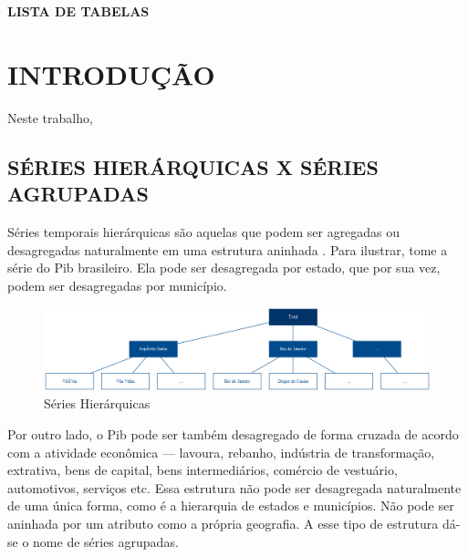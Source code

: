 \documentclass[
  12pt,
  letterpaper,
  DIV=11,
  numbers=noendperiod]{scrartcl}
\begin{document}
\newpage
\begin{center}
\MakeUppercase{\textbf{LISTA DE TABELAS}}
\end{center}
\begin{center}
\listoftables
\end{center}
\thispagestyle{empty}
\endgroup

\newpage

\hypertarget{introduuxe7uxe3o}{%
\section*{INTRODUÇÃO}\label{introduuxe7uxe3o}}

Neste trabalho,

\hypertarget{suxe9ries-hieruxe1rquicas-x-suxe9ries-agrupadas}{%
\subsection*{SÉRIES HIERÁRQUICAS X SÉRIES
AGRUPADAS}\label{suxe9ries-hieruxe1rquicas-x-suxe9ries-agrupadas}}

Séries temporais hierárquicas são aquelas que podem ser agregadas ou
desagregadas naturalmente em uma estrutura aninhada \citep{hyndman2021}.
Para ilustrar, tome a série do Pib brasileiro. Ela pode ser desagregada
por estado, que por sua vez, podem ser desagregadas por município.

\begin{figure}

{\centering \includegraphics{img/hierarq.png}

}

\caption{\label{fig-h}Séries Hierárquicas}

\end{figure}

Por outro lado, o Pib pode ser também desagregado de forma cruzada de
acordo com a atividade econômica --- lavoura, rebanho, indústria de
transformação, extrativa, bens de capital, bens intermediários, comércio
de vestuário, automotivos, serviços etc. Essa estrutura não pode ser
desagregada naturalmente de uma única forma, como é a hierarquia de
estados e municípios. Não pode ser aninhada por um atributo como a
própria geografia. A esse tipo de estrutura dá-se o nome de séries
agrupadas.
\end{document}

